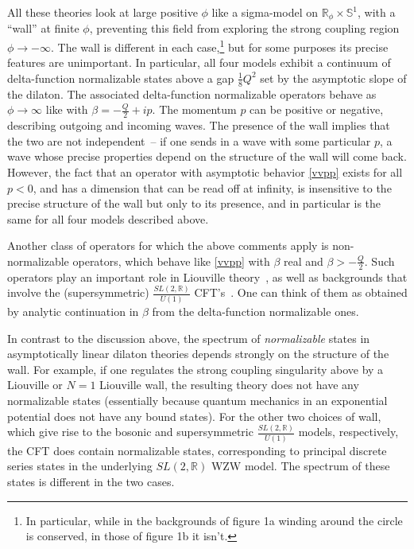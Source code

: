 \documentclass[12pt]{article}
\def\sltwo{\ensuremath{SL(2,\bR)}}
\newcommand{\bR}{{\mathbb R}}
\newcommand{\bS}{{\mathbb S}}
\numberwithin{equation}{section}
\begin{document}
All these theories look at large positive $\phi$ like a sigma-model on $\bR_\phi\times \bS^1$, with a ``wall'' at finite $\phi$, preventing this field from exploring the strong coupling region $\phi\to-\infty$. The wall is different in each case,\footnote{In particular, while in the backgrounds of figure 1a winding around the circle is conserved, in those of figure 1b it isn't.} but for some purposes its precise features are unimportant. In particular, all four models exhibit a continuum of delta-function normalizable states above a gap $\frac18 Q^2$ set by the asymptotic slope of the dilaton. 
%
The associated delta-function normalizable operators behave as $\phi\to\infty$ like 
with $\beta=-\frac{Q}{2}+ip$.  The momentum $p$ can be positive or negative, describing outgoing and incoming waves. The presence of the wall implies that the two are not independent~-- if one sends in a wave with some particular $p$, a wave whose precise properties depend on the structure of the wall will come back. However, the fact that an operator with asymptotic behavior \eqref{vvpp} exists for all $p<0$, and has a dimension that can be read off at infinity, is insensitive to the precise structure of the wall but only to its presence, and in particular is the same for all four models described above. 

Another class of operators for which the above comments apply is non-normalizable operators, which behave like \eqref{vvpp} with $\beta$ real and  $\beta>-\frac Q2$. Such operators play an important role in Liouville theory~, 
as well as backgrounds that involve the (supersymmetric) $\frac{\sltwo}{U(1)}$ CFT's~. 
One can think of them as obtained by analytic continuation in $\beta$ from the delta-function normalizable ones.

In contrast to the discussion above, the spectrum of {\it normalizable} states in asymptotically linear dilaton theories depends strongly on the structure of the wall. For example, if one regulates the strong coupling singularity above by a Liouville or $N=1$ Liouville wall, the resulting theory does not have any normalizable states (essentially because quantum mechanics in an exponential potential does not have any bound states). For the other two choices of wall, which give rise to the bosonic and supersymmetric $\frac{\sltwo}{U(1)}$ models, respectively, the CFT does contain normalizable states, corresponding to principal discrete series states in the underlying $\sltwo$ WZW model. The spectrum of these states is different in the two cases. 
\end{document}

